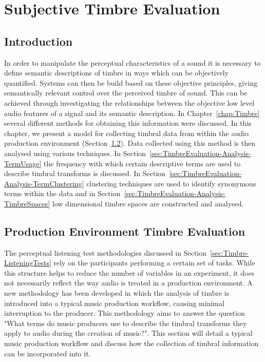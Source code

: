 \chapter{Subjective Timbre Evaluation}
\label{chap:TimbreEvaluation}

\section{Introduction}
\label{sec:TimbreEvaluation-Introduction}
	In order to manipulate the perceptual characteristics of a sound it is necessary to define semantic descriptions of
	timbre in ways which can be objectively quantified. Systems can then be build based on these objective principles,
	giving semantically relevant control over the perceived timbre of sound. This can be achieved through investigating
	the relationships between the objective low level audio features of a signal and its semantic description.  In
	Chapter~\ref{chap:Timbre} several different methods for obtaining this information were discussed. In this chapter,
	we present a model for collecting timbral data from within the audio production environment
	(Section~\ref{sec:TimbreEvaluation-DAWBasedTimbreEvaluation}). Data collected using this method is then analysed
	using various techniques. In Section~\ref{sec:TimbreEvaluation-Analysis-TermUsage} the frequency with which certain
	descriptive terms are used to describe timbral transforms is discussed. In
	Section~\ref{sec:TimbreEvaluation-Analysis-TermClustering} clustering techniques are used to identify synonymous
	terms within the data and in Section~\ref{sec:TimbreEvaluation-Analysis-TimbreSpaces} low dimensional timbre spaces
	are constructed and analysed.

\section{Production Environment Timbre Evaluation} %
\label{sec:TimbreEvaluation-DAWBasedTimbreEvaluation}
	The perceptual listening test methodologies discussed in Section~\ref{sec:Timbre-ListeningTests} rely on the
	participants performing a certain set of tasks. While this structure helps to reduce the number of variables in an
	experiment, it does not necessarily reflect the way audio is treated in a production environment. A new methodology
	has been developed in which the analysis of timbre is introduced into a typical music production workflow, causing
	minimal interruption to the producer. This methodology aims to answer the question "What terms do music producers
	use to describe the timbral transforms they apply to audio during the creation of music?". This section will
	detail a typical music production workflow and discuss how the collection of timbral information can be
	incorporated into it.

